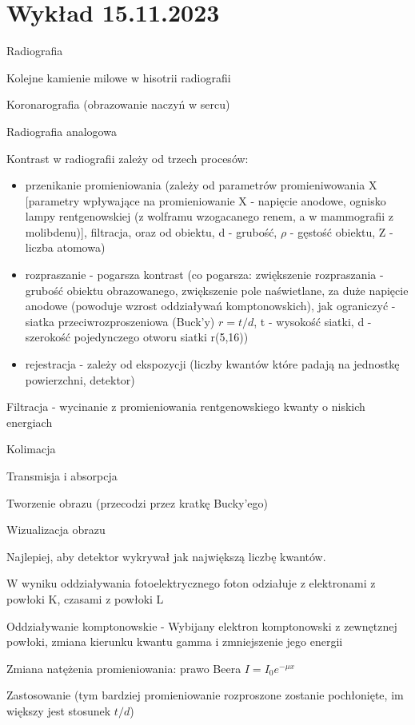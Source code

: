 \documentclass{article}
\begin{document}
\section{Wykład 15.11.2023}

Radiografia

Kolejne kamienie milowe w hisotrii radiografii

Koronarografia (obrazowanie naczyń w sercu)

Radiografia analogowa

Kontrast w radiografii zależy od trzech procesów:
\begin{itemize}
    \item przenikanie promieniowania (zależy od parametrów promieniwowania X [parametry wpływające na promieniowanie X - napięcie anodowe, ognisko lampy rentgenowskiej (z wolframu wzogacanego renem, a w mammografii z molibdenu)], filtracja, oraz od obiektu, d - grubość, $\rho$ - gęstość obiektu, Z - liczba atomowa)
    \item rozpraszanie - pogarsza kontrast (co pogarsza: zwiększenie rozpraszania - grubość obiektu obrazowanego, zwiększenie pole naświetlane, za duże napięcie anodowe (powoduje wzrost oddziaływań komptonowskich), jak ograniczyć - siatka przeciwrozproszeniowa (Buck'y) $r = t/d$, t - wysokość siatki, d - szerokość pojedynczego otworu siatki r(5,16))
    \item rejestracja - zależy od ekspozycji (liczby kwantów które padają na jednostkę powierzchni, detektor)
\end{itemize}

Filtracja - wycinanie z promieniowania rentgenowskiego kwanty o niskich energiach

Kolimacja

Transmisja i absorpcja

Tworzenie obrazu (przecodzi przez kratkę Bucky'ego)

Wizualizacja obrazu

Najlepiej, aby detektor wykrywał jak największą liczbę kwantów.

W wyniku oddziaływania fotoelektrycznego foton odziałuje z elektronami z powłoki K, czasami z powłoki L

Oddziaływanie komptonowskie - Wybijany elektron komptonowski z zewnętznej powłoki, zmiana kierunku kwantu gamma i zmniejszenie jego energii

Zmiana natężenia promieniowania: prawo Beera $I = I_0 e^{-\mu x}$

Zastosowanie (tym bardziej promieniowanie rozproszone zostanie pochłonięte, im większy jest stosunek $t/d$)
\end{document}
